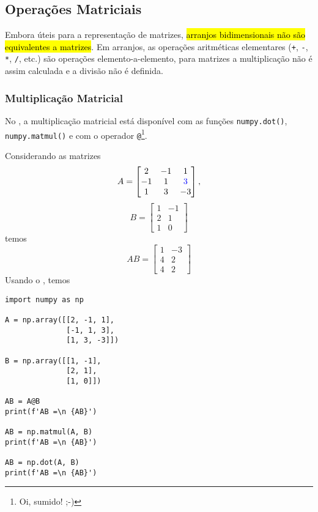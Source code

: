 \subsection{Operações Matriciais}

Embora úteis para a representação de matrizes, \hl{arranjos bidimensionais não são equivalentes a matrizes}. Em arranjos, as operações aritméticas elementares (\lstinline!+!, \lstinline!-!, \lstinline!*!, \lstinline!/!, etc.) são operações elemento-a-elemento, para matrizes a multiplicação não é assim calculada e a divisão não é definida.

\subsubsection{Multiplicação Matricial}

No {\numpy}, a multiplicação matricial está disponível com as funções \lstinline+numpy.dot()+, \lstinline+numpy.matmul()+ e com o operador \lstinline+@+\footnote{Oi, sumido! ;-)}.

\begin{ex}
  Considerando as matrizes
  \begin{equation}
    A =
    \begin{bmatrix}
      2 & -1 & 1\\
      -1 & 1 & {\color{blue}3}\\
      1 & 3 & -3
    \end{bmatrix},
  \end{equation}
  \begin{equation}
    B =
    \begin{bmatrix}
      1 & -1\\
      2 & 1\\
      1 & 0
    \end{bmatrix}
  \end{equation}
  temos
  \begin{equation}
    AB =
    \begin{bmatrix}
      1 & -3\\
      4 & 2\\
      4 & 2
    \end{bmatrix}
  \end{equation}
  Usando o {\numpy}, temos
\begin{lstlisting}
import numpy as np

A = np.array([[2, -1, 1],
              [-1, 1, 3],
              [1, 3, -3]])

B = np.array([[1, -1],
              [2, 1],
              [1, 0]])

AB = A@B
print(f'AB =\n {AB}')

AB = np.matmul(A, B)
print(f'AB =\n {AB}')

AB = np.dot(A, B)
print(f'AB =\n {AB}')
\end{lstlisting}
\end{ex}

